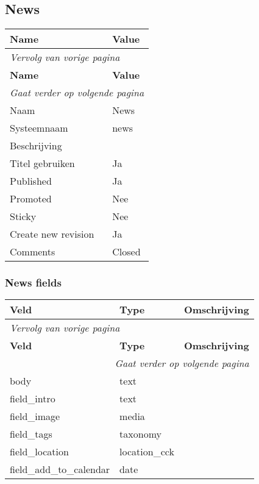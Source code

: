 \subsection{News}
\label{sec:content-news}
  \begin{longtable}{| p{7.50cm}|p{7.50cm}|}
  \hline
  \rowcolor{tableheader}
  \textbf{Name} & \textbf{Value}  \tabularnewline
  \hline
\endfirsthead
\multicolumn{2}{l}{\textit{Vervolg van vorige pagina}} \\
\hline
\rowcolor{tableheader}
  \textbf{Name} & \textbf{Value}  \tabularnewline
  \hline
\hline
\endhead
\multicolumn{2}{r}{\textit{Gaat verder op volgende pagina}} \\
\endfoot
\hline
\endlastfoot
  Naam & News  \tabularnewline
  \hline
  Systeemnaam & news  \tabularnewline
  \hline
  Beschrijving &   \tabularnewline
  \hline
  Titel gebruiken & Ja  \tabularnewline
  \hline
  Published & Ja  \tabularnewline
  \hline
  Promoted & Nee  \tabularnewline
  \hline
  Sticky & Nee  \tabularnewline
  \hline
  Create new revision & Ja  \tabularnewline
  \hline
  Comments & Closed  \tabularnewline
  \hline
  \end{longtable}

\subsubsection{News fields}
  \begin{longtable}{| p{5.00cm}|p{5.00cm}|p{5.00cm}|}
  \hline
  \rowcolor{tableheader}
  \textbf{Veld} & \textbf{Type} & \textbf{Omschrijving}  \tabularnewline
  \hline
\endfirsthead
\multicolumn{3}{l}{\textit{Vervolg van vorige pagina}} \\
\hline
\rowcolor{tableheader}
  \textbf{Veld} & \textbf{Type} & \textbf{Omschrijving}  \tabularnewline
  \hline
\hline
\endhead
\multicolumn{3}{r}{\textit{Gaat verder op volgende pagina}} \\
\endfoot
\hline
\endlastfoot
  body & text &   \tabularnewline
  \hline
  field\_intro & text &   \tabularnewline
  \hline
  field\_image & media &   \tabularnewline
  \hline
  field\_tags & taxonomy &   \tabularnewline
  \hline
  field\_location & location\_cck &   \tabularnewline
  \hline
  field\_add\_to\_calendar & date &   \tabularnewline
  \hline
  \end{longtable}

